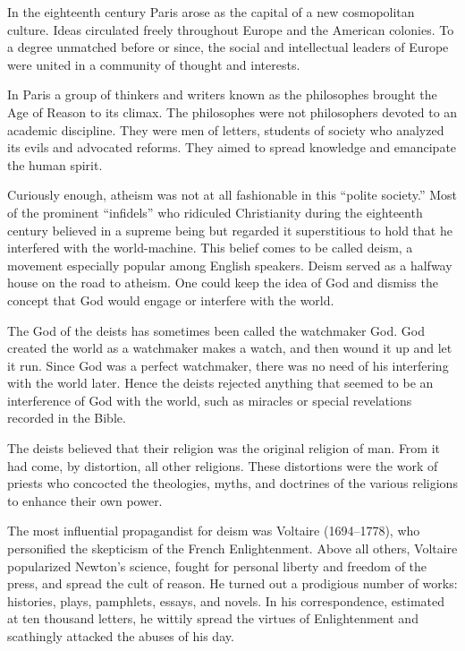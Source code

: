 In the eighteenth century Paris arose as the capital of a new cosmopolitan culture. Ideas circulated
freely throughout Europe and the American colonies. To a degree unmatched before or since, the
social and intellectual leaders of Europe were united in a community of thought and interests.

In Paris a group of thinkers and writers known as the philosophes brought the Age of Reason to its
climax. The philosophes were not philosophers devoted to an academic discipline. They were men of
letters, students of society who analyzed its evils and advocated reforms. They aimed to spread
knowledge and emancipate the human spirit.

Curiously enough, atheism was not at all fashionable in this “polite society.” Most of the prominent
“infidels” who ridiculed Christianity during the eighteenth century believed in a supreme being but
regarded it superstitious to hold that he interfered with the world-machine. This belief comes to be
called deism, a movement especially popular among English speakers. Deism served as a halfway house
on the road to atheism. One could keep the idea of God and dismiss the concept that God would engage
or interfere with the world.

The God of the deists has sometimes been called the watchmaker God. God created the world as a
watchmaker makes a watch, and then wound it up and let it run. Since God was a perfect watchmaker,
there was no need of his interfering with the world later. Hence the deists rejected anything that
seemed to be an interference of God with the world, such as miracles or special revelations recorded
in the Bible.

The deists believed that their religion was the original religion of man. From it had come, by
distortion, all other religions. These distortions were the work of priests who concocted the
theologies, myths, and doctrines of the various religions to enhance their own power.

The most influential propagandist for deism was Voltaire (1694–1778), who personified the skepticism
of the French Enlightenment. Above all others, Voltaire popularized Newton’s science, fought for
personal liberty and freedom of the press, and spread the cult of reason. He turned out a prodigious
number of works: histories, plays, pamphlets, essays, and novels. In his correspondence, estimated
at ten thousand letters, he wittily spread the virtues of Enlightenment and scathingly attacked the
abuses of his day.

